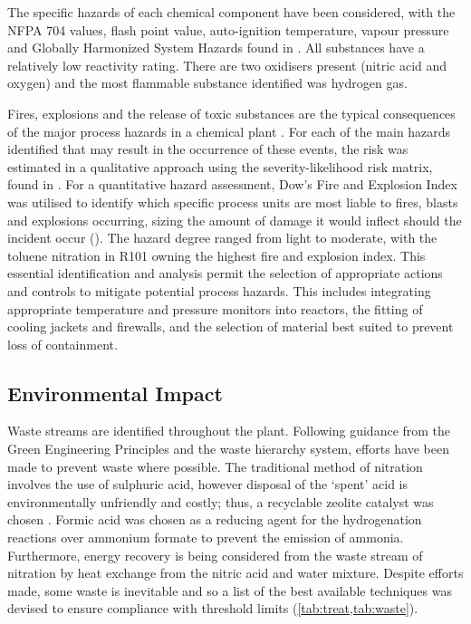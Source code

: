 The specific hazards of each chemical component have been considered, with the NFPA 704 values, flash point value, auto-ignition temperature, vapour pressure and Globally Harmonized System Hazards found in . All substances have a relatively low reactivity rating. There are two oxidisers present (nitric acid and oxygen) and the most flammable substance identified was hydrogen gas.  

Fires, explosions and the release of toxic substances are the typical consequences of the major process hazards in a chemical plant \cite{mannan_lees_2012}. For each of the main hazards identified that may result in the occurrence of these events, the risk was estimated in a qualitative approach using the severity-likelihood risk matrix, found in . For a quantitative hazard assessment, Dow's Fire and Explosion Index was utilised to identify which specific process units are most liable to fires, blasts and explosions occurring, sizing the amount of damage it would inflect should the incident occur (). The hazard degree ranged from light to moderate, with the toluene nitration in R101 owning the highest fire and explosion index. This essential identification and analysis permit the selection of appropriate actions and controls to mitigate potential process hazards. This includes integrating appropriate temperature and pressure monitors into reactors, the fitting of cooling jackets and firewalls, and the selection of material best suited to prevent loss of containment.


\subsection{Environmental Impact}
Waste streams are identified throughout the plant. Following guidance from the Green Engineering Principles and the waste hierarchy system, efforts have been made to prevent waste where possible. The traditional method of nitration involves the use of sulphuric acid, however disposal of the ‘spent’ acid is environmentally unfriendly and costly; thus, a recyclable zeolite catalyst was chosen \cite{smith_superior_1996}.  Formic acid was chosen as a reducing agent for the hydrogenation reactions over ammonium formate to prevent the emission of ammonia. Furthermore, energy recovery is being considered from the waste stream of nitration by heat exchange from the nitric acid and water mixture. 
Despite efforts made, some waste is inevitable and so a list of the best available techniques was devised to ensure compliance with threshold limits (\cref{tab:treat,tab:waste}). 
